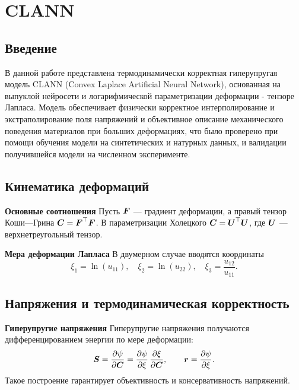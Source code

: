 \chapter{CLANN}

\section{Введение}
В данной работе представлена термодинамически корректная гиперупругая модель CLANN 
(Convex Laplace Artificial Neural Network),
основанная на выпуклой нейросети и логарифмической параметризации деформации - тензоре Лапласа. 
Модель обеспечивает физически корректное интерполирование и экстраполирование поля напряжений и объективное описание механического поведения материалов при больших деформациях,
что было
 проверено при помощи обучения модели на синтетических и натурных данных, и валидации получившейся модели на численном эксперименте.

\section{Кинематика деформаций}
\textbf{Основные соотношения}
Пусть \(\boldsymbol{F}\) — градиент деформации, а правый тензор Коши—Грина \(\boldsymbol{C} = \boldsymbol{F}^{\top} \boldsymbol{F}\).
В параметризации Холецкого \(\boldsymbol{C} = \boldsymbol{U}^{\top}\boldsymbol{U}\), где \(\boldsymbol{U}\) — верхнетреугольный тензор.

\textbf{Мера деформации Лапласа}
В двумерном случае вводятся координаты
\begin{equation}
\xi_1 = \ln(u_{11}),\quad \xi_2 = \ln(u_{22}),\quad \xi_3 = \frac{u_{12}}{u_{11}}.
\end{equation}

\section{Напряжения и термодинамическая корректность}
\textbf{Гиперупругие напряжения}
Гиперупругие напряжения получаются дифференцированием энергии по мере деформации:
\begin{equation}
 \boldsymbol{S} = \frac{\partial\psi}{\partial\boldsymbol{C}} = \frac{\partial\psi}{\partial \xi}\,\frac{\partial \xi}{\partial \boldsymbol{C}},\qquad \boldsymbol{r}=\frac{\partial\psi}{\partial\xi}.
\label{eq:hyperelastic_stress}
\end{equation}
Такое построение гарантирует объективность и консервативность напряжений.

